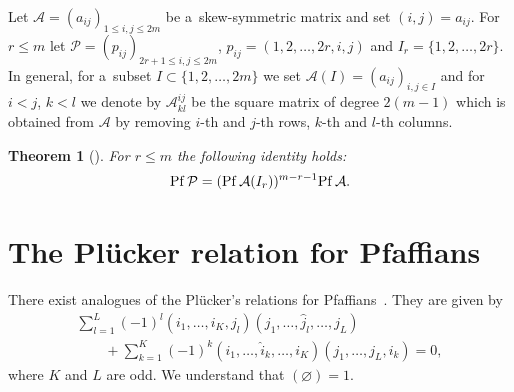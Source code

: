 \documentclass[11pt]{article}
\newtheorem{theorem}{Theorem}
\begin{document}
  Let ${\mathcal A}=(a_{ij})_{1\le i,j\le2m}$ be a~skew-symmetric matrix and set $(i,j)=a_{ij}$.
For $r\le m$ let ${\mathcal P} =(p_{ij})_{2r+1\le i,j\le2m}$, $p_{ij}=(1,2,\dots,2r,i,j)$ and $I_r=\{1,2,\dots,2r\}$.
In general, for a~subset $I\subset\{1,2,\dots,2m\}$ we set ${\mathcal A}(I)=(a_{ij})_{i,j\in I}$ and for $i<j$, $k<l$
we denote by ${\mathcal A}_{kl}^{ij}$ be the square matrix of degree $2(m-1)$ which is obtained from ${\mathcal A}$ by
removing $i$-th and $j$-th rows, $k$-th and $l$-th columns.

\begin{theorem}[\cite{H2}]\label{theorem5} For $r\le m$ the following identity holds:
\begin{gather*}%
{\rm Pf}\,{\mathcal P}=({\rm Pf}\,{\mathcal A}(I_r))^{m-r-1}{\rm Pf}\,{\mathcal A}.
\end{gather*}
\end{theorem}

\section{The Pl\"{u}cker relation for Pfaf\/f\/ians}\label{appendixC}

 There exist analogues of the Pl\"{u}cker's
relations for Pfaf\/f\/ians~\cite{O1}.
They are given by
\begin{gather}
\sum_{l=1}^L(-1)^l(i_1,\dots,i_K,j_l)(j_1,\dots,\hat{j}_l,\dots,j_L)
\nonumber
\\
\qquad
{}+\sum_{k=1}
^K(-1)^k(i_1,\dots,\hat{i}_k,\dots,i_K)(j_1,\dots,j_L,i_k)=0,
\label{eq:75}
\end{gather}
where $K$ and $L$ are odd.
We understand that $(\varnothing)=1$.
\end{document}
